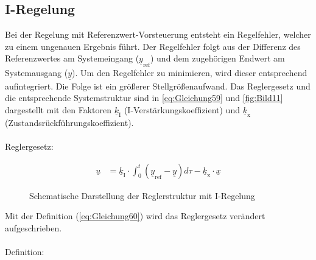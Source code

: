 \subsection{I-Regelung}
Bei der Regelung mit Referenzwert-Vorsteuerung entsteht ein Regelfehler, welcher zu einem ungenauen Ergebnis führt. Der Regelfehler folgt aus der Differenz des Referenzwertes am Systemeingang ($\underline{y}_{\mathrm{ref}}$) und dem zugehörigen Endwert am Systemausgang ($\underline{y}$). Um den Regelfehler zu minimieren, wird dieser entsprechend aufintegriert. Die Folge ist ein größerer Stellgrößenaufwand. Das Reglergesetz und die entsprechende Systemstruktur sind in \autoref{eq:Gleichung59} und \autoref{fig:Bild11} dargestellt mit den Faktoren $\underline{k}_{\mathrm{I}}$ (I-Verstärkungskoeffizient) und $\underline{k}_{\mathrm{x}}$ (Zustandsrückführungskoeffizient).\\\\
Reglergesetz:

\begin{align}\label{eq:Gleichung59}
    \underline{u} &= \underline{k}_{\mathrm{I}}\cdot\int_{0}^t(\underline{y}_{\mathrm{ref}}-\underline{y})d\tau-\underline{k}_{\mathrm{x}}\cdot\underline{x}
\end{align}

\begin{figure}[H]
    \centering
    \caption[Reglerstruktur I-Regelung]{Schematische Darstellung der Reglerstruktur mit I-Regelung}
    \label{fig:Bild11}
\end{figure}

Mit der Definition (\autoref{eq:Gleichung60}) wird das Reglergesetz verändert aufgeschrieben.\\\\
Definition:

